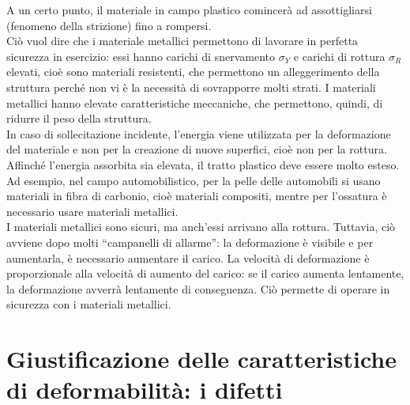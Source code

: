 A un certo punto, il materiale in campo plastico comincerà ad assottigliarsi (fenomeno della strizione) fino a rompersi.\\
Ciò vuol dire che i materiale metallici permettono di lavorare in perfetta sicurezza in esercizio: essi hanno carichi di snervamento $\sigma_Y$ e carichi di rottura $\sigma_R$ elevati, cioè sono materiali resistenti, che permettono un alleggerimento della struttura perché non vi è la necessità di sovrapporre molti strati. I materiali metallici hanno elevate caratteristiche meccaniche, che permettono, quindi, di ridurre il peso della struttura.\\
In caso di sollecitazione incidente, l’energia viene utilizzata per la deformazione del materiale e non per la creazione di nuove superfici, cioè non per la rottura. Affinché l’energia assorbita sia elevata, il tratto plastico deve essere molto esteso. Ad esempio, nel campo automobilistico, per la pelle delle automobili si usano materiali in fibra di carbonio, cioè materiali compositi, mentre per l’ossatura è necessario usare materiali metallici.\\

I materiali metallici sono sicuri, ma anch’essi arrivano alla rottura. Tuttavia, ciò avviene dopo molti “campanelli di allarme”: la deformazione è visibile e per aumentarla, è necessario aumentare il carico. La velocità di deformazione è proporzionale alla velocità di aumento del carico: se il carico aumenta lentamente, la deformazione avverrà lentamente di conseguenza. Ciò permette di operare in sicurezza con i materiali metallici.

\section{Giustificazione delle caratteristiche di deformabilità: i difetti} 

